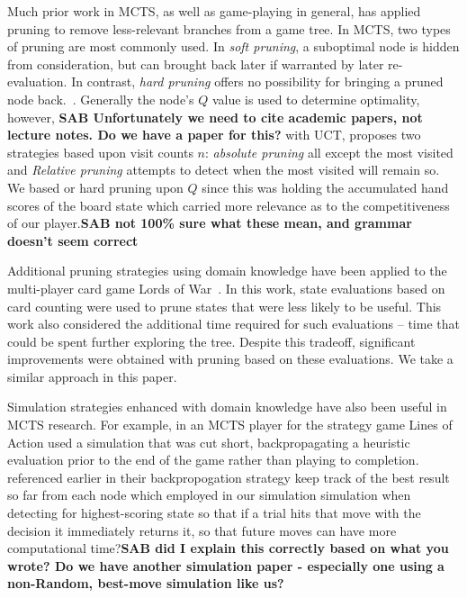 \documentclass[letterpaper]{article}
\begin{document}
Much prior work in MCTS, as well as game-playing in general, has applied pruning to remove less-relevant branches from a game tree. In MCTS, two types of pruning are most commonly used. In {\it soft pruning}, a suboptimal node is hidden from consideration, but can brought back later if warranted by later re-evaluation. In contrast, {\it hard pruning} offers no possibility for bringing a pruned node back.~\cite{browne2012survey}. Generally the node's $Q$ value is used to determine optimality, however,  {\bf SAB Unfortunately we need to cite academic papers, not lecture notes. Do we have a paper for this?} with UCT, \cite{huang2010pruning} proposes two strategies based upon visit counts $n$: \emph{absolute pruning} all except the most visited and \emph{Relative pruning} attempts to detect when the most visited will remain so. We based or hard pruning upon $Q$ since this was holding the accumulated hand scores of the board state which carried more relevance as to the competitiveness of our player.{\bf SAB not 100\% sure what these mean, and grammar doesn't seem correct}

Additional pruning strategies using domain knowledge have been applied to the multi-player card game Lords of War~\cite{sephton2014ieee}. In this work, state evaluations based on card counting were used to prune states that were less likely to be useful. This work also considered the additional time required for such evaluations -- time that could be spent further exploring the tree. Despite this tradeoff, significant improvements were obtained with pruning based on these evaluations. We take a similar approach in this paper.

Simulation strategies enhanced with domain knowledge have also been useful in MCTS research. For example, in \cite{winands2010monte} an MCTS player for the strategy game Lines of Action used a simulation that was cut short, backpropagating a heuristic evaluation prior to the end of the game rather than playing to completion. \cite{schadd2012single} referenced earlier in their backpropogation strategy keep track of the best result so far from each node which employed in our simulation simulation when detecting for highest-scoring state so that if a trial hits that move with the decision it immediately returns it, so that future moves can have more computational time?{\bf SAB did I explain this correctly based on what you wrote? Do we have another simulation paper - especially one using a non-Random, best-move simulation like us?}

\end{document}
